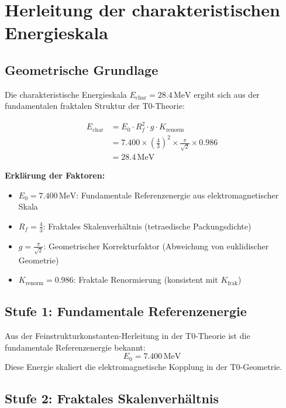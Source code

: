 	\section{Herleitung der charakteristischen Energieskala}
	
	\subsection{Geometrische Grundlage}
	
	Die charakteristische Energieskala $E_{\text{char}} = 28.4\,\text{MeV}$ ergibt sich aus der fundamentalen fraktalen Struktur der T0-Theorie:
	
	\begin{align}
		E_{\text{char}} &= E_0 \cdot R_f^2 \cdot g \cdot K_{\text{renorm}} \\
		&= 7.400 \times \left(\frac{4}{3}\right)^2 \times \frac{\pi}{\sqrt{2}} \times 0.986 \\
		&= 28.4\,\text{MeV}
	\end{align}
	
	\textbf{Erklärung der Faktoren:}
	\begin{itemize}
		\item $E_0 = 7.400\,\text{MeV}$: Fundamentale Referenzenergie aus elektromagnetischer Skala
		\item $R_f = \frac{4}{3}$: Fraktales Skalenverhältnis (tetraedische Packungsdichte)  
		\item $g = \frac{\pi}{\sqrt{2}}$: Geometrischer Korrekturfaktor (Abweichung von euklidischer Geometrie)
		\item $K_{\text{renorm}} = 0.986$: Fraktale Renormierung (konsistent mit $K_{\text{frak}}$)
	\end{itemize}
	
	\subsection{Stufe 1: Fundamentale Referenzenergie}
	
	Aus der Feinstrukturkonstanten-Herleitung in der T0-Theorie ist die fundamentale Referenzenergie bekannt:
	\begin{equation}
		E_0 = 7.400\,\text{MeV}
	\end{equation}
	Diese Energie skaliert die elektromagnetische Kopplung in der T0-Geometrie.
	
	\subsection{Stufe 2: Fraktales Skalenverhältnis}
	
